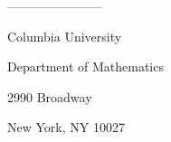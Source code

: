 \documentclass[10pt]{article}
\begin{document}
%

%

%

%
%
%

%

%
%
%
%
%
%
%
%
%
%
%

%

%

%
%

%

%
%
%
%
%
%

%
%
%
%
%
%
%
%

%

%
%
%
%
%
%
%

%
%

%

%
%
%
%
%

%
%
%
%
%
%

%
%
%
%
%

%

%
%
%
%
%
%
%
%

%
%
%
%
%
%
%

%
%
%
%
%
%
%
%
%
%
%

%
%
%
%
%
%
%
%
%
%
%
%
%
%
%
%
%
%
%
%
%
%
%
%
%
%

%
%
%
%
%
%
%
%
%
%
%
%
%

%

%
%
%
%

%
%
%
%
%
%
%
%
%
%
%
%
%
%
%
%
%
%
%
%
%

%
%
%
%
%
%
%
%
%
%
%
%
%
%
%

%
%
%
%
%
%
%
%
%
%
%
%
%
%
%
%
%
%
%
%
%
%
%
%
%
%
%
%
%
%
%

%
%
%
%
%

%
%

%

%

%

%
%
%
%

%
%
%
%
%
%
%

%
%
%

%
%

%

%

%

%

%

%
%
%
%
%
%
%
%
%
%
%
%
%
%
%
%
%

%
%
%
%
%
%

%
%
%

%
%

%
%
%
%
%
%

%
%
%
%
%
%
%
%
%
%
%
%
%

%

%
%
%
%
%
%
%
%
%
%

%
%
%
%
%
%
%
%
%
%
%
%
%
%
%
%
%
%
%
%
%
%
%

%

%

%

%

%
%
%
%
%

%
%
%
%
%
%
%
%
%

%
%

%

%

%
%






-----------------------

Columbia University

Department of Mathematics

2990 Broadway 

New York, NY 10027
\end{document}
